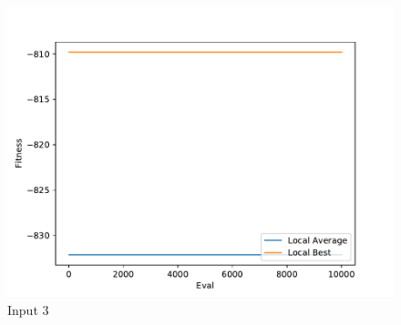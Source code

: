 \documentclass{standalone}
\begin{document}
\begin{figure}[!htb]
	\caption{Input 3}
	\label{fig:graph_3043}
	\includegraphics[width=\textwidth]{../graphs/graphs/3043.pdf}
\end{figure}
\end{document}
